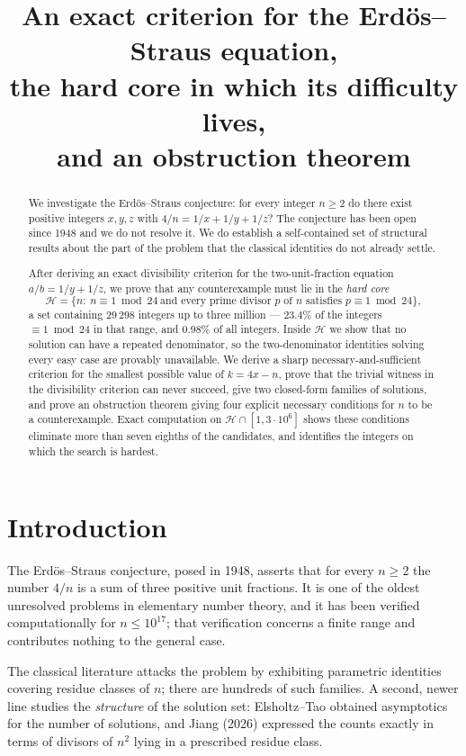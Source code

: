 \documentclass[11pt,a4paper]{article}
\title{An exact criterion for the Erd\"os--Straus equation,\\
the hard core in which its difficulty lives,\\
and an obstruction theorem}
\author{}
\date{}
\theoremstyle{definition}
\begin{document}
\maketitle

\begin{abstract}
We investigate the Erd\"os--Straus conjecture: for every integer $n\ge 2$ do
there exist positive integers $x,y,z$ with $4/n=1/x+1/y+1/z$? The conjecture has
been open since 1948 and we do not resolve it. We do establish a self-contained
set of structural results about the part of the problem that the classical
identities do not already settle.

After deriving an exact divisibility criterion for the two-unit-fraction
equation $a/b=1/y+1/z$, we prove that any counterexample must lie in the
\emph{hard core}
\[
  \mathcal H=\{n:\ n\equiv 1 \bmod 24\ \text{and every prime divisor }p
  \text{ of } n \text{ satisfies } p\equiv 1\bmod 24\},
\]
a set containing $29\,298$ integers up to three million --- $23.4\%$ of the
integers $\equiv 1\bmod 24$ in that range, and $0.98\%$ of all integers.
Inside $\mathcal H$ we show that no solution can have a repeated denominator, so
the two-denominator identities solving every easy case are provably
unavailable.
We derive a sharp necessary-and-sufficient criterion for the smallest possible
value of $k=4x-n$, prove that the trivial witness in the divisibility criterion
can never succeed, give two closed-form families of solutions, and prove an
obstruction theorem giving four explicit necessary conditions for $n$ to be a
counterexample. Exact computation on $\mathcal H\cap[1,3\cdot 10^{6}]$ shows
these conditions eliminate more than seven eighths of the candidates, and
identifies the integers on which the search is hardest.
\end{abstract}

\section{Introduction}

The Erd\"os--Straus conjecture, posed in 1948, asserts that for every
$n\ge 2$ the number $4/n$ is a sum of three positive unit fractions. It is one of
the oldest unresolved problems in elementary number theory, and it has been
verified computationally for $n\le 10^{17}$; that verification concerns a finite
range and contributes nothing to the general case.

The classical literature attacks the problem by exhibiting parametric
identities covering residue classes of $n$; there are hundreds of such families.
A second, newer line studies the \emph{structure} of the solution set:
Elsholtz--Tao obtained asymptotics for the number of solutions, and Jiang (2026)
expressed the counts exactly in terms of divisors of $n^2$ lying in a
prescribed residue class.
\end{document}
